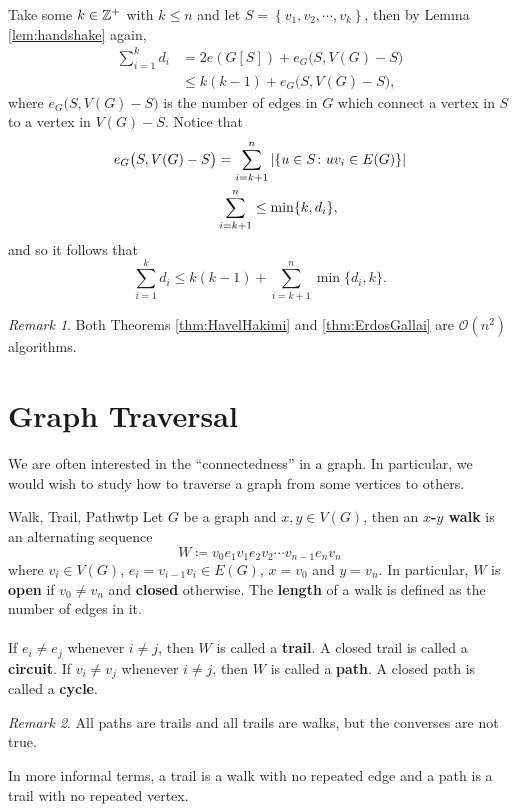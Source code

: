 \documentclass[math]{amznotes}
\theoremstyle{remark}
\newtheorem*{remark}{Remark}
\newcommand{\0}{\mathbf{0}}
\newcommand{\1}{\mathbf{1}}
\begin{document}
Take some $k \in \mathbb{Z}^+$ with $k \leq n$ and let $S = \left\{v_1, v_2, \cdots, v_k\right\}$, then by Lemma \ref{lem:handshake} again,
\begin{align*}
    \sum_{i = 1}^{k}d_i & = 2e(G[S]) + e_G\bigl(S, V(G) - S\bigr) \\
    & \leq k(k - 1) + e_G\bigl(S, V(G) - S\bigr),
\end{align*}
where $e_G\bigl(S, V(G) - S\bigr)$ is the number of edges in $G$ which connect a vertex in $S$ to a vertex in $V(G) - S$. Notice that
\begin{align*}
    e_G\bigl(S, V(G) - S\bigr) & = \sum_{i = k + 1}^n{\left\lvert {\left\{u \in S \colon uv_i \in E(G)\right\}} \right\rvert} \\
    & \sum_{i = k + 1}^n\leq \min\{k, d_i\},
\end{align*}
and so it follows that
\begin{equation*}
    \sum_{i = 1}^{k} d_i \leq k(k - 1) + \sum_{i = k + 1}^{n}\min\{d_i, k\}.
\end{equation*}
\begin{notebox}
    \begin{remark}
        Both Theorems \ref{thm:HavelHakimi} and \ref{thm:ErdosGallai} are $\mathcal{O}(n^2)$ algorithms.
    \end{remark}
\end{notebox}


\section{Graph Traversal}
We are often interested in the ``connectedness'' in a graph. In particular, we would wish to study how to traverse a graph from some vertices to others.
\begin{dfnbox}{Walk, Trail, Path}{wtp}
    Let $G$ be a graph and $x, y \in V(G)$, then an {\color{red} \textbf{$x$-$y$ walk}} is an alternating sequence
    \begin{equation*}
        W \coloneqq v_0e_1v_1e_2v_2\cdots v_{n - 1}e_nv_n
    \end{equation*}
    where $v_i \in V(G)$, $e_i = v_{i - 1}v_i \in E(G)$, $x = v_0$ and $y = v_n$. In particular, $W$ is {\color{red} \textbf{open}} if $v_0 \neq v_n$ and {\color{red} \textbf{closed}} otherwise. The {\color{red} \textbf{length}} of a walk is defined as the number of edges in it.
    \\\\
    If $e_i \neq e_j$ whenever $i \neq j$, then $W$ is called a {\color{red} \textbf{trail}}. A closed trail is called a {\color{red} \textbf{circuit}}. If $v_i \neq v_j$ whenever $i \neq j$, then $W$ is called a {\color{red} \textbf{path}}. A closed path is called a {\color{red} \textbf{cycle}}.
\end{dfnbox}
\begin{notebox}
    \begin{remark}
        All paths are trails and all trails are walks, but the converses are not true.
    \end{remark}
\end{notebox}
In more informal terms, a trail is a walk with no repeated edge and a path is a trail with no repeated vertex.
\end{document}

